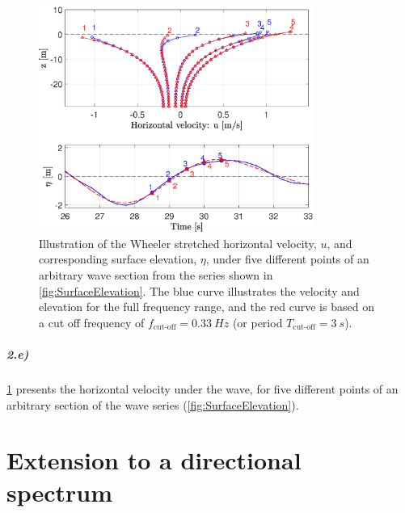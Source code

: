 \begin{figure}[htbp]
    \centering
    \includegraphics[width=0.8\textwidth]{Figures/Plots/etaHozvel.eps}
    \caption{Illustration of the Wheeler stretched horizontal velocity, $u$, and corresponding surface elevation, $\eta$, under five different points of an arbitrary wave section from the series shown in \cref{fig:SurfaceElevation}. The blue curve illustrates the velocity and elevation for the full frequency range, and the red curve is based on a cut off frequency of $f_{\text{cut-off}}=\SI{0.33}{Hz}$ (or period $T_{\text{cut-off}}=\SI{3}{s}$). }
    \label{fig:etaHozvel}
\end{figure}

\paragraph{2.e)} \cref{fig:etaHozvel} presents the horizontal velocity under the wave, for five different points of an arbitrary section of the wave series (\cref{fig:SurfaceElevation}). 


\vspace{15mm}
{\let\clearpage\relax \chapter{Extension to a directional spectrum}}

